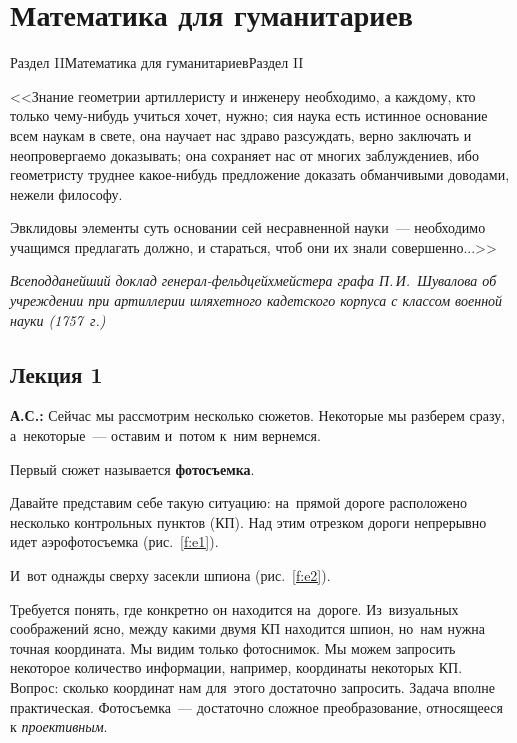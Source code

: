 \chapter{Математика для гуманитариев}{Раздел II}{Математика для гуманитариев}{Раздел II}

{\small
<<Знание геометрии артиллеристу и инженеру необходимо, а каждому, кто только
чему-нибудь учиться хочет, нужно; сия наука есть истинное основание всем наукам
в свете, она научает нас здраво разсуждать, верно заключать и неопровергаемо
доказывать; она сохраняет нас от многих заблуждениев, ибо геометристу труднее
какое-нибудь предложение доказать обманчивыми доводами, нежели философу.

Эвклидовы элементы суть основании сей несравненной науки~--- необходимо
учащимся предлагать должно, и стараться, чтоб они их знали совершенно...>>

\smallskip

\textit{Всеподданейший доклад генерал-фельдцейхмейстера графа П.\,И.~Шувалова об учреждении
при артиллерии шляхетного кадетского корпуса с классом военной науки (1757~г.)}


}

\thispagestyle{empty}

\newpage

\section{Лекция 1}
\label{2.1}

\textbf{А.С.:} Сейчас мы рассмотрим несколько сюжетов. Некоторые мы разберем сразу, а~некоторые~--- оставим
и~потом к~ним вернемся.

Первый сюжет называется \textbf{фотосъемка}.

Давайте представим себе такую ситуацию: на~прямой дороге расположено несколько контрольных пунктов (КП). Над
этим отрезком дороги непрерывно идет аэрофотосъемка (рис.~\ref{f:e1}).


И~вот однажды сверху засекли шпиона (рис.~\ref{f:e2}).


Требуется понять, где конкретно он находится на~дороге. Из~визуальных соображений ясно, между какими двумя КП находится шпион,
но~нам нужна точная координата. Мы видим только фотоснимок.
Мы можем запросить некоторое количество информации, например, координаты некоторых КП.
Вопрос: сколько координат нам
для~этого достаточно запросить. Задача вполне практическая. Фотосъемка~--- достаточно сложное
преобразование, относящееся к \textit{проективным}.

